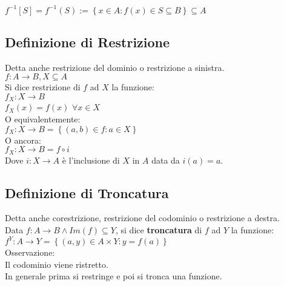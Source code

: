 \documentclass[a4paper, twoside, italian, 11pt]{book}
\newcommand{\braces}[1] {\left\{#1\right\}}
\begin{document}
$f^{-1}[S] = f^{-1}(S) := \braces{x \in A : f(x) \in S \subseteq B} \subseteq A$


\subsection{Definizione di Restrizione}

Detta anche restrizione del dominio o restrizione a sinistra. \\

\noindent
$f : A \rightarrow B, X \subseteq A$ \\

\noindent
Si dice restrizione di $f$ ad $X$ la funzione: \\

$f_X : X \rightarrow B$ \\
\indent
$f_X(x) = f(x)$ $\forall x \in X$ \\

\noindent
O equivalentemente: \\

$f_X : X \rightarrow B = \braces{(a, b) \in f : a \in X}$ \\

\noindent
O ancora: \\

$f_X : X \rightarrow B = f \circ i$ \\

\noindent
Dove $i : X \rightarrow A$ è l'inclusione di $X$ in $A$ data da $i(a) = a$.


\subsection{Definizione di Troncatura}

Detta anche corestrizione, restrizione del codominio o restrizione a destra. \\

\noindent
Data $f : A \rightarrow B \land Im(f) \subseteq Y$, si dice \textbf{troncatura} di $f$ ad $Y$ la funzione: \\

$f^Y : A \rightarrow Y = \braces{(a, y) \in A \times Y : y = f(a)}$ \\

\noindent
Osservazione: \\
Il codominio viene ristretto.\\

\noindent
In generale prima si restringe e poi si tronca una funzione.
\end{document}
